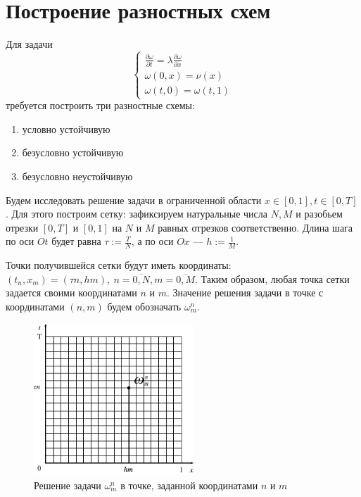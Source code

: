 \documentclass[titlepage]{article}
\def\part{\partial}
\begin{document}
\section{Построение разностных схем}
Для задачи 
\begin{equation*}
 \begin{cases}
 	\frac{\part \omega}{\part t} = \lambda\frac{\part \omega}{\part x}
 	\\
	\omega(0, x) = \nu(x)
	\\	
	\omega(t, 0) = \omega(t, 1)
 \end{cases}
\end{equation*}
требуется построить три разностные схемы:
\begin{enumerate}
	\item условно устойчивую
	\item безусловно устойчивую
	\item безусловно неустойчивую
\end{enumerate}

Будем исследовать решение задачи в ограниченной области $x \in [0,1], t \in [0, T]$. Для этого построим сетку: зафиксируем натуральные числа $N,M$ и разобьем отрезки $[0,T]$ и $[0,1]$ на $N$ и $M$ равных отрезков соответственно. Длина шага по оси $Ot$ будет равна $\tau := \frac{T}{N}$, а по оси $Ox$ --- $h := \frac{1}{M}$. 

Точки получившейся сетки будут иметь координаты: $(t_n, x_m) = (\tau n, hm), \ n = \overline{0,N}, m = \overline{0,M}$. Таким образом, любая точка сетки задается своими координатами $n$ и $m$. Значение решения задачи в точке с координатами $(n,m)$ будем обозначать $\omega^n_m$.

\begin{figure}[h]
\center
\includegraphics[width = 60mm]{img1.pdf}
\caption{Решение задачи $\omega^n_m$ в точке, заданной координатами $n$ и $m$}
\end{figure}
\end{document}
